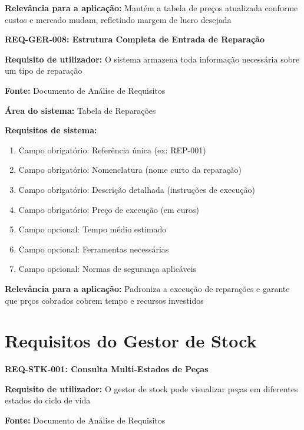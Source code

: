 \documentclass[11pt,a4paper]{article}
\newcommand{\reqheader}[1]{{\noindent\large\bfseries\color{sectionblue}#1}\par\vspace{0.3cm}}
\newcommand{\reqfield}[2]{{\noindent\textbf{#1:} #2}\par\vspace{0.2cm}}
\begin{document}
\reqfield{Relevância para a aplicação}{Mantém a tabela de preços atualizada conforme custos e mercado mudam, refletindo margem de lucro desejada}

\vspace{0.8cm}

\reqheader{REQ-GER-008: Estrutura Completa de Entrada de Reparação}

\reqfield{Requisito de utilizador}{O sistema armazena toda informação necessária sobre um tipo de reparação}

\reqfield{Fonte}{Documento de Análise de Requisitos}

\reqfield{Área do sistema}{Tabela de Reparações}

\reqfield{Requisitos de sistema}{
	\begin{enumerate}
		\item Campo obrigatório: Referência única (ex: REP-001)
		\item Campo obrigatório: Nomenclatura (nome curto da reparação)
		\item Campo obrigatório: Descrição detalhada (instruções de execução)
		\item Campo obrigatório: Preço de execução (em euros)
		\item Campo opcional: Tempo médio estimado
		\item Campo opcional: Ferramentas necessárias
		\item Campo opcional: Normas de segurança aplicáveis
	\end{enumerate}
}

\reqfield{Relevância para a aplicação}{Padroniza a execução de reparações e garante que prços cobrados cobrem tempo e recursos investidos}

\vspace{1.5cm}


\section*{Requisitos do Gestor de Stock}

\reqheader{REQ-STK-001: Consulta Multi-Estados de Peças}

\reqfield{Requisito de utilizador}{O gestor de stock pode visualizar peças em diferentes estados do ciclo de vida}

\reqfield{Fonte}{Documento de Análise de Requisitos}
\end{document}
